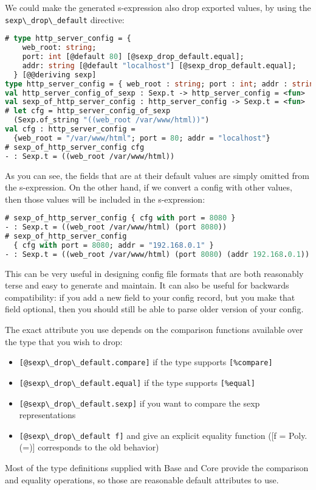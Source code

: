 We could make the generated s-expression also drop exported values, by
using the \passthrough{\lstinline!sexp\_drop\_default!} directive:

\begin{lstlisting}[language=Caml]
# type http_server_config = {
    web_root: string;
    port: int [@default 80] [@sexp_drop_default.equal];
    addr: string [@default "localhost"] [@sexp_drop_default.equal];
  } [@@deriving sexp]
type http_server_config = { web_root : string; port : int; addr : string; }
val http_server_config_of_sexp : Sexp.t -> http_server_config = <fun>
val sexp_of_http_server_config : http_server_config -> Sexp.t = <fun>
# let cfg = http_server_config_of_sexp
  (Sexp.of_string "((web_root /var/www/html))")
val cfg : http_server_config =
  {web_root = "/var/www/html"; port = 80; addr = "localhost"}
# sexp_of_http_server_config cfg
- : Sexp.t = ((web_root /var/www/html))
\end{lstlisting}

As you can see, the fields that are at their default values are simply
omitted from the s-expression. On the other hand, if we convert a config
with other values, then those values will be included in the
s-expression:

\begin{lstlisting}[language=Caml]
# sexp_of_http_server_config { cfg with port = 8080 }
- : Sexp.t = ((web_root /var/www/html) (port 8080))
# sexp_of_http_server_config
  { cfg with port = 8080; addr = "192.168.0.1" }
- : Sexp.t = ((web_root /var/www/html) (port 8080) (addr 192.168.0.1))
\end{lstlisting}

This can be very useful in designing config file formats that are both
reasonably terse and easy to generate and maintain. It can also be
useful for backwards compatibility: if you add a new field to your
config record, but you make that field optional, then you should still
be able to parse older version of your config. ~

The exact attribute you use depends on the comparison functions
available over the type that you wish to drop:

\begin{itemize}
\tightlist
\item
  \passthrough{\lstinline![@sexp\_drop\_default.compare]!} if the type
  supports \passthrough{\lstinline![\%compare]!}
\item
  \passthrough{\lstinline![@sexp\_drop\_default.equal]!} if the type
  supports \passthrough{\lstinline![\%equal]!}
\item
  \passthrough{\lstinline![@sexp\_drop\_default.sexp]!} if you want to
  compare the sexp representations
\item
  \passthrough{\lstinline![@sexp\_drop\_default f]!} and give an
  explicit equality function ({[}f = Poly.(=){]} corresponds to the old
  behavior)
\end{itemize}

Most of the type definitions supplied with Base and Core provide the
comparison and equality operations, so those are reasonable default
attributes to use.
